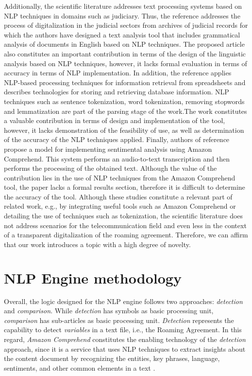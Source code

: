 \documentclass[conference]{style/IEEEtran}
\begin{document}
Additionally, the scientific literature addresses text processing systems based on NLP techniques in domains such as judiciary. Thus, the reference \cite{8487847} addresses the process of digitalization in the judicial sectors from archives of judicial records for which the authors have designed a text analysis tool that includes grammatical analysis of documents in English based on NLP techniques. The proposed article also constitutes an important contribution in terms of the design of the linguistic analysis based on NLP techniques, however, it lacks formal evaluation in terms of accuracy in terms of NLP implementation. In addition, the reference \cite{9138070} applies NLP-based processing techniques for information retrieval from spreadsheets and describes technologies for storing and retrieving database information. NLP techniques such as sentence tokenization, word tokenization, removing stopwords and lemmatization are part of the parsing stage of the work.The work constitutes a valuable contribution in terms of design and implementation of the tool, however, it lacks demonstration of the feasibility of use, as well as determination of the accuracy of the NLP techniques applied. Finally, authors of reference \cite{9104105} propose a model for implementing sentimental analysis using Amazon Comprehend. This system performs an audio-to-text transcription and then performs the processing of the obtained text. Although the value of the contribution lies in the use of NLP techniques from the Amazon Comprehend tool, the paper lacks a formal results section, therefore it is difficult to determine the accuracy of the tool. Although these studies  constitute a relevant part of related work, e.g., by integrating useful tools such as Amazon Comprehend or detailing the use of techniques such as tokenization, the scientific literature does not address scenarios for the telecommunication field and even less in the context of a transparent digitalization of the roaming agreement. Therefore, we can affirm that our work introduces a topic with a high degree of novelty.

\section{NLP Engine methodology}
Overall, the logic designed for the NLP engine follows two approaches: \textit{detection} and \textit{comparison}. While \textit{detection} has symbols as basic processing unit, \textit{comparison} has sub-articles as basic processing unit. \textit{Detection} represents the capability to detect \textit{variables} in a text file, i.e., the Roaming Agreement. In this regard, \textit{Amazon Comprehend} constitutes the enabling technology of the \textit{detection} approach, since it is a service that uses NLP techniques to extract insights about the content document by recognizing  the  entities,  key  phrases,  language,  sentiments,  and  other  common  elements  in  a  text \cite{AWS2021}.
\end{document}
